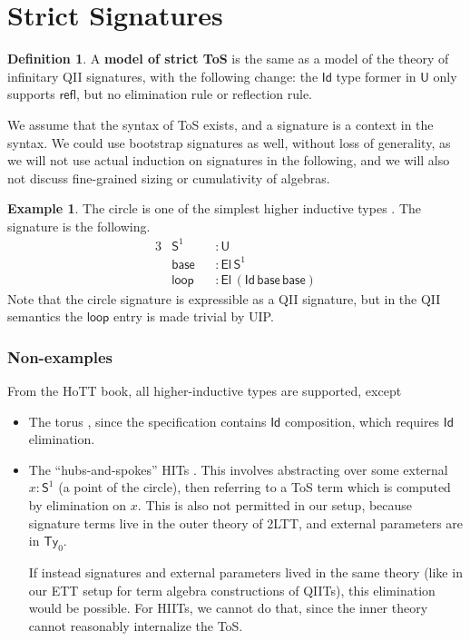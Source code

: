 \documentclass[12pt,a4paper,twoside,openany]{book}
\theoremstyle{remark}
\theoremstyle{definition}
\newtheorem{mydefinition}{Definition}
\newtheorem{myexample}{Example}
\theoremstyle{theorem}
\newcommand{\ms}[1]{\mathsf{#1}}
\newcommand{\refl}{\mathsf{refl}}
\newcommand{\Ty}{\mathsf{Ty}}
\newcommand{\U}{\mathsf{U}}
\newcommand{\El}{\mathsf{El}}
\newcommand{\Id}{\mathsf{Id}}
\begin{document}
\section{Strict Signatures}

\begin{mydefinition}
A \textbf{model of strict ToS} is the same as a model of the theory of
infinitary QII signatures, with the following change: the $\Id$ type former in
$\U$ only supports $\refl$, but no elimination rule or reflection rule.
\end{mydefinition}

We assume that the syntax of ToS exists, and a signature is a context in the
syntax. We could use bootstrap signatures as well, without loss of generality,
as we will not use actual induction on signatures in the following, and we will
also not discuss fine-grained sizing or cumulativity of algebras.

\begin{myexample} The circle is one of the simplest higher inductive types \cite[Section~6.4]{hottbook}. The signature is the following.
\begin{alignat*}{3}
  &\ms{S}^1  &&: \U\\
  &\ms{base} &&: \El\,\ms{S}^1\\
  &\ms{loop} &&: \El\,(\Id\,\ms{base}\,\ms{base})
\end{alignat*}
Note that the circle signature is expressible as a QII signature, but in the QII
semantics the $\ms{loop}$ entry is made trivial by UIP.
\end{myexample}

\subsubsection{Non-examples}
From the HoTT book, all higher-inductive types are supported, except
\begin{itemize}
\item
  The torus \cite[Section~6.6]{hottbook}, since the specification contains $\Id$
  composition, which requires $\Id$ elimination.
\item
  The ``hubs-and-spokes'' HITs \cite[Section~6.7]{hottbook}.  This involves
  abstracting over some external $x : \ms{S}^1$ (a point of the circle), then
  referring to a ToS term which is computed by elimination on $x$. This is also
  not permitted in our setup, because signature terms live in the outer theory
  of 2LTT, and external parameters are in $\Ty_0$.

  If instead signatures and external parameters lived in the same theory (like in
  our ETT setup for term algebra constructions of QIITs), this elimination would
  be possible. For HIITs, we cannot do that, since the inner theory cannot
  reasonably internalize the ToS.
\end{itemize}
\end{document}
